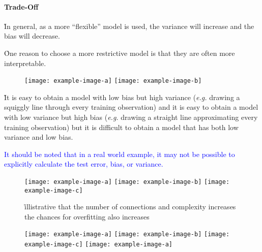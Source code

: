 \paragraph{Trade-Off}


\r{In general, as a more ``flexible'' model is used, the variance will increase and the bias will decrease.}

\r{One reason to choose a more restrictive model is that they are often more interpretable.}

\begin{figure}[htp]
	\centering
	\texttt{[image: example-image-a]}\hfil
	\texttt{[image: example-image-b]}\hfil
	\caption{}
	\label{fig:basics_eval_tradeoff_examples}
\end{figure}


\r{It is easy to obtain a model with low bias but high variance (\emph{e.g.} drawing a squiggly line through every training observation) and it is easy to obtain a model with low variance but high bias (\emph{e.g.} drawing a straight line approximating every training observation) but it is difficult to obtain a model that has both low variance and low bias.}

\textcolor{blue}{It should be noted that in a real world example, it may not be possible to explicitly calculate the test error, bias, or variance.}



\begin{figure}[htp]
	\centering
	\texttt{[image: example-image-a]}\hfil
	\texttt{[image: example-image-b]}\hfil
	\texttt{[image: example-image-c]}\hfil
	\caption{ \r{illistrative that the number of connections and complexity increases the chances for overfitting also increases}}
	\label{fig:basics_eval_nodesinhidden}
\end{figure}


\begin{figure}[htp]
	\centering
	\texttt{[image: example-image-a]}\hfil
	\texttt{[image: example-image-b]}\hfil
	\texttt{[image: example-image-c]}\hfil
	\texttt{[image: example-image-a]}\hfil
	\caption{}
	\label{fig:basics_eval_numlayers}
\end{figure}

